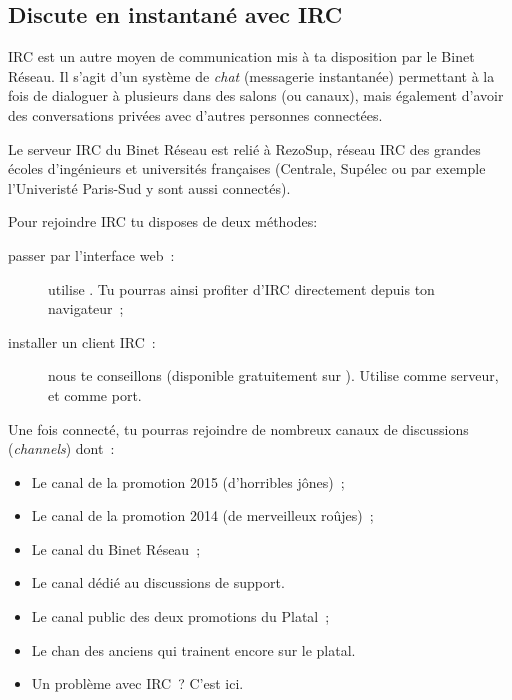 %
\subsection{Discute en instantané avec IRC}

\label{irc}

IRC est un autre moyen de communication mis à ta disposition par le Binet Réseau.
Il s'agit d'un système de \emph{chat} (messagerie instantanée) permettant à la fois de dialoguer à plusieurs dans des salons (ou canaux),
mais également d'avoir des conversations privées avec d'autres personnes connectées.


Le serveur IRC du Binet Réseau est relié à RezoSup, réseau IRC des grandes écoles d'ingénieurs et universités françaises (Centrale, Supélec ou par exemple l'Univeristé Paris-Sud y sont aussi connectés).

Pour rejoindre IRC tu disposes de deux méthodes:

\begin{description}
  \item[passer par l'interface web~:] utilise . Tu pourras ainsi profiter d'IRC directement depuis ton navigateur~;
  \item[installer un client IRC~:] nous te conseillons  (disponible gratuitement sur \linebreak {}). Utilise   comme serveur, et  comme port.
\end{description}

Une fois connecté, tu pourras rejoindre de nombreux canaux de discussions (\emph{channels}) dont~:
\begin{itemize}
  \item {} Le canal de la promotion 2015 (d'horribles jônes)~;
   \item {} Le canal de la promotion 2014 (de merveilleux roûjes)~;
  \item {} Le canal du Binet Réseau~;
  \item {} Le canal dédié au discussions de support.
  \item {} Le canal public des deux promotions du Platal~;
  \item {} Le chan des anciens qui trainent encore sur le platal.
  \item {} Un problème avec IRC~? C'est ici.
\end{itemize}

